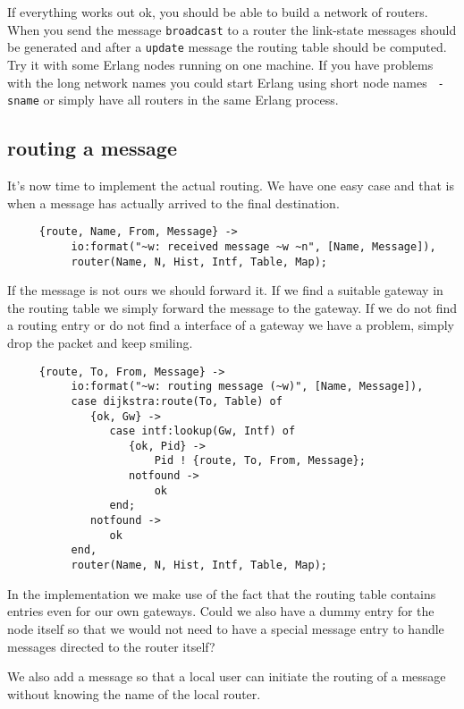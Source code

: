 \documentclass[a4paper, 11pt]{article}
\begin{document}
If everything works out ok, you should be able to build a network of
routers. When you send the message {\tt broadcast} to a router the
link-state messages should be generated and after a {\tt update}
message the routing table should be computed. Try it with some Erlang
nodes running on one machine. If you have problems with the long
network names you could start Erlang using short node names {\tt
-sname} or simply have all routers in the same Erlang process.

\subsection{routing a message}

It's now time to implement the actual routing. We have one easy case
and that is when a message has actually arrived to the final
destination.

\begin{verbatim}
     {route, Name, From, Message} ->
          io:format("~w: received message ~w ~n", [Name, Message]),
          router(Name, N, Hist, Intf, Table, Map);
\end{verbatim}

\noindent If the message is not ours we should forward it. If we find a suitable
gateway in the routing table we simply forward the message to the
gateway. If we do not find a routing entry or do not find a interface
of a gateway we have a problem, simply drop the packet and keep
smiling.

\begin{verbatim}
     {route, To, From, Message} ->
          io:format("~w: routing message (~w)", [Name, Message]),
          case dijkstra:route(To, Table) of
             {ok, Gw} -> 
                case intf:lookup(Gw, Intf) of
                   {ok, Pid} ->
                       Pid ! {route, To, From, Message};
                   notfound ->
                       ok
                end;
             notfound ->
                ok
          end,
          router(Name, N, Hist, Intf, Table, Map);         
\end{verbatim}

\noindent In the implementation we make use of the fact that the
routing table contains entries even for our own gateways. Could we
also have a dummy entry for the node itself so that we would not need
to have a special message entry to handle messages directed to the
router itself?

We also add a message so that a local user can initiate the routing of
a message without knowing the name of the local router.
\end{document}
